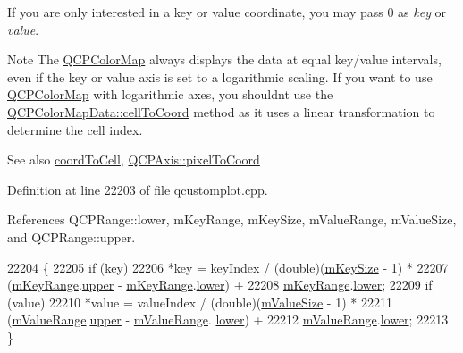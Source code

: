 If you are only interested in a key or value coordinate, you may pass 0 as {\itshape key} or {\itshape value}.

\begin{DoxyNote}{Note}
The \hyperlink{class_q_c_p_color_map}{Q\+C\+P\+Color\+Map} always displays the data at equal key/value intervals, even if the key or value axis is set to a logarithmic scaling. If you want to use \hyperlink{class_q_c_p_color_map}{Q\+C\+P\+Color\+Map} with logarithmic axes, you shouldn\textquotesingle{}t use the \hyperlink{class_q_c_p_color_map_data_ac96d6e84befe7b9951b5da6d4d4a2a47}{Q\+C\+P\+Color\+Map\+Data\+::cell\+To\+Coord} method as it uses a linear transformation to determine the cell index.
\end{DoxyNote}
\begin{DoxySeeAlso}{See also}
\hyperlink{class_q_c_p_color_map_data_a26e33c5ec7094b60136350bcd77d3737}{coord\+To\+Cell}, \hyperlink{class_q_c_p_axis_ae9289ef7043b9d966af88eaa95b037d1}{Q\+C\+P\+Axis\+::pixel\+To\+Coord} 
\end{DoxySeeAlso}


Definition at line 22203 of file qcustomplot.\+cpp.



References Q\+C\+P\+Range\+::lower, m\+Key\+Range, m\+Key\+Size, m\+Value\+Range, m\+Value\+Size, and Q\+C\+P\+Range\+::upper.


\begin{DoxyCode}
22204                                                        \{
22205   \textcolor{keywordflow}{if} (key)
22206     *key = keyIndex / (double)(\hyperlink{class_q_c_p_color_map_data_a354e06462023340fbc03894b22499f6d}{mKeySize} - 1) *
22207                (\hyperlink{class_q_c_p_color_map_data_aaaafd0d7d0f153dbd152f3daf34254ee}{mKeyRange}.\hyperlink{class_q_c_p_range_ae44eb3aafe1d0e2ed34b499b6d2e074f}{upper} - \hyperlink{class_q_c_p_color_map_data_aaaafd0d7d0f153dbd152f3daf34254ee}{mKeyRange}.\hyperlink{class_q_c_p_range_aa3aca3edb14f7ca0c85d912647b91745}{lower}) +
22208            \hyperlink{class_q_c_p_color_map_data_aaaafd0d7d0f153dbd152f3daf34254ee}{mKeyRange}.\hyperlink{class_q_c_p_range_aa3aca3edb14f7ca0c85d912647b91745}{lower};
22209   if (value)
22210     *value = valueIndex / (double)(\hyperlink{class_q_c_p_color_map_data_ae8ee9093632a59f55eb4fc06579ed256}{mValueSize} - 1) *
22211                  (\hyperlink{class_q_c_p_color_map_data_a225bb96f10c1a27b51ae59249477dbef}{mValueRange}.\hyperlink{class_q_c_p_range_ae44eb3aafe1d0e2ed34b499b6d2e074f}{upper} - \hyperlink{class_q_c_p_color_map_data_a225bb96f10c1a27b51ae59249477dbef}{mValueRange}.
      \hyperlink{class_q_c_p_range_aa3aca3edb14f7ca0c85d912647b91745}{lower}) +
22212              \hyperlink{class_q_c_p_color_map_data_a225bb96f10c1a27b51ae59249477dbef}{mValueRange}.\hyperlink{class_q_c_p_range_aa3aca3edb14f7ca0c85d912647b91745}{lower};
22213 \}
\end{DoxyCode}
\hypertarget{class_q_c_p_color_map_data_a9910ba830e96955bd5c8e5bef1e77ef3}{}
